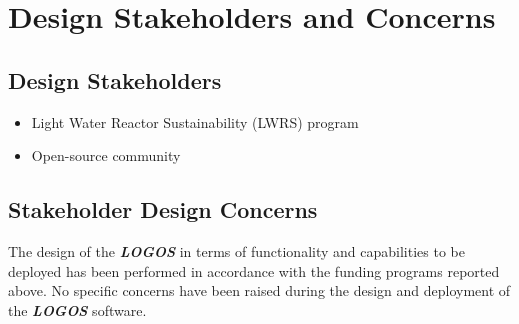 \section{Design Stakeholders and Concerns}
\subsection{Design Stakeholders}
\begin{itemize}
  \item Light Water Reactor Sustainability (LWRS) program
  \item Open-source community
\end{itemize}
\subsection{Stakeholder Design Concerns}
The design of the \textbf{\textit{LOGOS}} in terms of functionality and
capabilities to be deployed has been performed in accordance with the funding
programs reported above. No specific concerns have been raised during the design and
deployment of the \textbf{\textit{LOGOS}} software.
